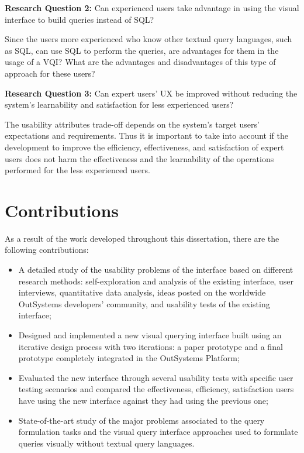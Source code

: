 \medskip

\textbf{Research Question 2:} Can experienced users take advantage in using the visual interface to build queries instead of \gls{SQL}?

\medskip

Since the users more experienced who know other textual query languages, such as \gls{SQL}, can use \gls{SQL} to perform the queries, are advantages for them in the usage of a \gls{VQI}? What are the advantages and disadvantages of this type of approach for these users?

\medskip

\textbf{Research Question 3:} Can expert users' \gls{UX} be improved without reducing the system's learnability and satisfaction for less experienced users?


\medskip

The usability attributes trade-off depends on the system's target users' expectations and requirements. Thus it is important to take into account if the development to improve the efficiency, effectiveness, and satisfaction of expert users does not harm the effectiveness and the learnability of the operations performed for the less experienced users.

\section{Contributions}
\label{sec:contributions}
As a result of the work developed throughout this dissertation, there are the following contributions:

\begin{itemize}
  \item A detailed study of the usability problems of the interface based on different research methods: self-exploration and analysis of the existing interface, user interviews, quantitative data analysis, ideas posted on the worldwide OutSystems developers' community, and usability tests of the existing interface;
  \item Designed and implemented a new visual querying interface built using an iterative design process with two iterations: a paper prototype and a final prototype completely integrated in the OutSystems Platform;
  \item Evaluated the new interface through several usability tests with specific user testing scenarios and compared the effectiveness, efficiency, satisfaction users have using the new interface against they had using the previous one;
  \item State-of-the-art study of the major problems associated to the query formulation tasks and the visual query interface approaches used to formulate queries visually without textual query languages.
\end{itemize} 

